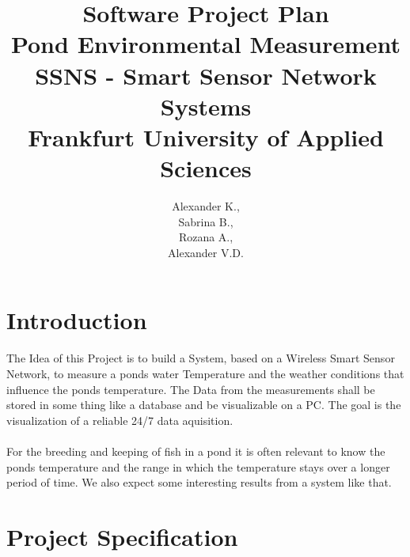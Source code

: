 \documentclass[
	11pt,
	a4paper
]{article}%
\begin{document}

\setcounter{tocdepth}{3} 
\setcounter{secnumdepth}{3} 


\title{\textbf{Software Project Plan}\\
	Pond Environmental Measurement\\
	SSNS - Smart Sensor Network Systems\\
	Frankfurt University of Applied Sciences}
\author{Alexander K.,\\
	Sabrina B.,\\
	Rozana A.,\\
	Alexander V.D.}
\maketitle


\newpage
{}
\tableofcontents
\newpage

\section{Introduction}
The Idea of this Project is to build a System, based on a Wireless Smart Sensor Network, to measure a ponds water Temperature and the weather conditions that influence the ponds temperature. The Data from the measurements shall be stored in some thing like a database and be visualizable on a PC. The goal is the visualization of a reliable 24/7 data aquisition.
\\\\
For the breeding and keeping of fish in a pond it is often relevant to know the ponds temperature and the range in which the temperature stays over a longer period of time. We also expect some interesting results from a system like that.

\section{Project Specification}
\end{document}
